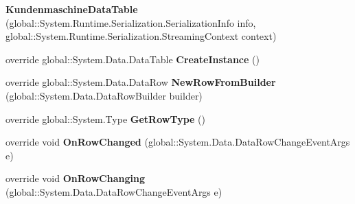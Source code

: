 \begin{DoxyCompactItemize}
\item 
{\bfseries Kundenmaschine\+Data\+Table} (global\+::\+System.\+Runtime.\+Serialization.\+Serialization\+Info info, global\+::\+System.\+Runtime.\+Serialization.\+Streaming\+Context context)\hypertarget{class_products_1_1_data_1_1ds_sage_1_1_kundenmaschine_data_table_a675826bbdb06fa75bccf1d9929cfb49c}{}\label{class_products_1_1_data_1_1ds_sage_1_1_kundenmaschine_data_table_a675826bbdb06fa75bccf1d9929cfb49c}

\item 
override global\+::\+System.\+Data.\+Data\+Table {\bfseries Create\+Instance} ()\hypertarget{class_products_1_1_data_1_1ds_sage_1_1_kundenmaschine_data_table_ad083bbbdb1272d41f586d8f671f7015d}{}\label{class_products_1_1_data_1_1ds_sage_1_1_kundenmaschine_data_table_ad083bbbdb1272d41f586d8f671f7015d}

\item 
override global\+::\+System.\+Data.\+Data\+Row {\bfseries New\+Row\+From\+Builder} (global\+::\+System.\+Data.\+Data\+Row\+Builder builder)\hypertarget{class_products_1_1_data_1_1ds_sage_1_1_kundenmaschine_data_table_aa6ddd36f7f5abc25b41c287327e19749}{}\label{class_products_1_1_data_1_1ds_sage_1_1_kundenmaschine_data_table_aa6ddd36f7f5abc25b41c287327e19749}

\item 
override global\+::\+System.\+Type {\bfseries Get\+Row\+Type} ()\hypertarget{class_products_1_1_data_1_1ds_sage_1_1_kundenmaschine_data_table_adbba36d43032acc87c19d588fefb4e1c}{}\label{class_products_1_1_data_1_1ds_sage_1_1_kundenmaschine_data_table_adbba36d43032acc87c19d588fefb4e1c}

\item 
override void {\bfseries On\+Row\+Changed} (global\+::\+System.\+Data.\+Data\+Row\+Change\+Event\+Args e)\hypertarget{class_products_1_1_data_1_1ds_sage_1_1_kundenmaschine_data_table_a5f6a2e2db887a026222c4068fb57e8a9}{}\label{class_products_1_1_data_1_1ds_sage_1_1_kundenmaschine_data_table_a5f6a2e2db887a026222c4068fb57e8a9}

\item 
override void {\bfseries On\+Row\+Changing} (global\+::\+System.\+Data.\+Data\+Row\+Change\+Event\+Args e)\hypertarget{class_products_1_1_data_1_1ds_sage_1_1_kundenmaschine_data_table_a25ae410650dd9621b3f3ee6aaebb198b}{}\label{class_products_1_1_data_1_1ds_sage_1_1_kundenmaschine_data_table_a25ae410650dd9621b3f3ee6aaebb198b}


\end{DoxyCompactItemize}
